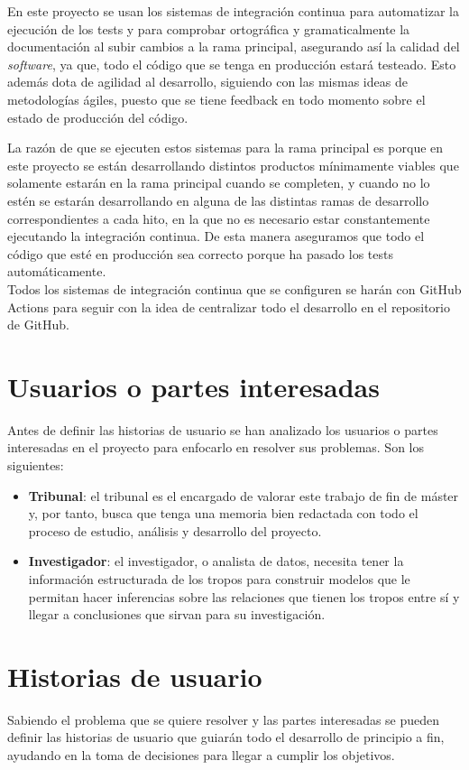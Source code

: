 En este proyecto se usan los sistemas de integración continua para automatizar la ejecución de los tests y para comprobar ortográfica y gramaticalmente la documentación al subir cambios a la rama principal, asegurando así la calidad del \textit{software}, ya que, todo el código que se tenga en producción estará testeado. Esto además dota de agilidad al desarrollo, siguiendo con las mismas ideas de metodologías ágiles, puesto que se tiene feedback en todo momento sobre el estado de producción del código.

La razón de que se ejecuten estos sistemas para la rama principal es porque en este proyecto se están desarrollando distintos productos mínimamente viables que solamente estarán en la rama principal cuando se completen, y cuando no lo estén se estarán desarrollando en alguna de las distintas ramas de desarrollo correspondientes a cada hito, en la que no es necesario estar constantemente ejecutando la integración continua. De esta manera aseguramos que todo el código que esté en producción sea correcto porque ha pasado los tests automáticamente.\\

Todos los sistemas de integración continua que se configuren se harán con GitHub Actions para seguir con la idea de centralizar todo el desarrollo en el repositorio de GitHub.

\section{Usuarios o partes interesadas}
Antes de definir las historias de usuario se han analizado los usuarios o partes interesadas en el proyecto para enfocarlo en resolver sus problemas. Son los siguientes:
\begin{itemize}
    \item \textbf{Tribunal}: el tribunal es el encargado de valorar este trabajo de fin de máster y, por tanto, busca que tenga una memoria bien redactada con todo el proceso de estudio, análisis y desarrollo del proyecto.
    \item \textbf{Investigador}: el investigador, o analista de datos, necesita tener la información estructurada de los tropos para construir modelos que le permitan hacer inferencias sobre las relaciones que tienen los tropos entre sí y llegar a conclusiones que sirvan para su investigación.
\end{itemize}

\section{Historias de usuario}
Sabiendo el problema que se quiere resolver y las partes interesadas se pueden definir las historias de usuario que guiarán todo el desarrollo de principio a fin, ayudando en la toma de decisiones para llegar a cumplir los objetivos.


